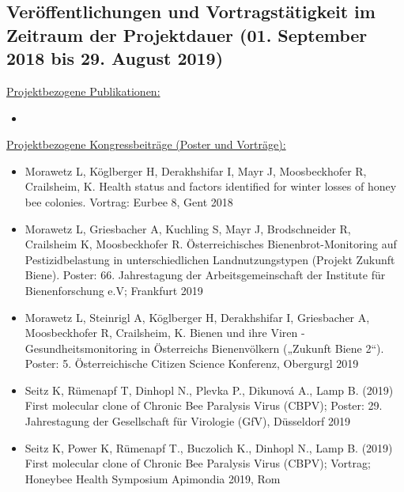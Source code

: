 \subsection*{Veröffentlichungen und Vortragstätigkeit im Zeitraum der Projektdauer (01. September 2018 bis 29. August 2019)}
\label{cha:publications}

\underline{Projektbezogene Publikationen:}


\begin{itemize}
   
    \item 

\end{itemize}

\underline{Projektbezogene Kongressbeiträge (Poster und Vorträge):}

\begin{itemize}

    \item 
    Morawetz L, Köglberger H, Derakhshifar I, Mayr J, Moosbeckhofer R, Crailsheim, K. Health status and factors identified for winter losses of honey bee colonies. Vortrag: Eurbee 8, Gent 2018
    
    \item 
    Morawetz L, Griesbacher A, Kuchling S, Mayr J, Brodschneider R, Crailsheim K, Moosbeckhofer R. Österreichisches Bienenbrot-Monitoring auf Pestizidbelastung in unterschiedlichen Landnutzungstypen (Projekt Zukunft Biene). Poster: 66. Jahrestagung der Arbeitsgemeinschaft der Institute für Bienenforschung e.V; Frankfurt 2019

    \item 
    Morawetz L, Steinrigl A, Köglberger H, Derakhshifar I, Griesbacher A, Moosbeckhofer R, Crailsheim, K. Bienen und ihre Viren - Gesundheitsmonitoring in Österreichs Bienenvölkern („Zukunft Biene 2“). Poster: 5. Österreichische Citizen Science Konferenz, Obergurgl 2019

    \item 
    Seitz K, Rümenapf T, Dinhopl N., Plevka P., Dikunová A., Lamp B. (2019) First molecular clone of Chronic Bee Paralysis Virus (CBPV); Poster: 29. Jahrestagung der Gesellschaft für Virologie (GfV), Düsseldorf 2019

    \item 
    Seitz K, Power K, Rümenapf T., Buczolich K., Dinhopl N., Lamp B. (2019) First molecular clone of Chronic Bee Paralysis Virus (CBPV); Vortrag; Honeybee Health Symposium Apimondia 2019, Rom

\end{itemize}


